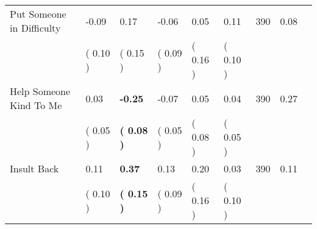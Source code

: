 \begin{tabular}{L{6.2cm} C{1.8cm} C{1.8cm} C{1.8cm} C{1.8cm} C{1.8cm} C{1.8cm} C{0.3cm} C{0.3cm}}
Put Someone in Difficulty &     -0.09 &      0.17 &     -0.06 &      0.05 &      0.11  & 390 &       0.08 \\ 
 & (     0.10 ) & (     0.15 ) & (     0.09 ) & (     0.16 ) & (     0.10 )  & \\
Help Someone Kind To Me &      0.03 & \textbf{    -0.25} &     -0.07 &      0.05 &      0.04  & 390 &       0.27 \\ 
 & (     0.05 ) & \textbf{(     0.08 )} & (     0.05 ) & (     0.08 ) & (     0.05 )  & \\
Insult Back &      0.11 & \textbf{     0.37} &      0.13 &      0.20 &      0.03  & 390 &       0.11 \\ 
 & (     0.10 ) & \textbf{(     0.15 )} & (     0.09 ) & (     0.16 ) & (     0.10 )  & \\
\bottomrule
\end{tabular}
